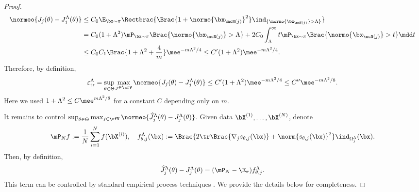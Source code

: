 \documentclass[11pt]{article}
\begin{document}
\begin{proof}
\begin{align*}
    \normeo{J_j(\theta)-J_j^\Lambda(\theta)}
    &\le C_0 \E_{\bx\sim\pi} \Rectbrac{\Brac{1+\normo{\bx_{\mcN(j)}}^2}\ind_{\{\normo{\bx_{\mcN(j)}}>\Lambda\}}} \\
    &= C_0(1+\Lambda^2) \mP_{\bx\sim\pi} \Brac{ \normo{\bx_{\mcN(j)}}>\Lambda } 
    +2C_0\int_\Lambda^\infty t\mP_{\bx\sim\pi} \Brac{\normo{\bx_{\mcN(j)}}>t} \mdd t \\
    &\le C_0C_1\Brac{1+\Lambda^2+\frac{4}{m}}\mee^{-m\Lambda^2/4}
    \le C'(1+\Lambda^2)\mee^{-m\Lambda^2/4}.
\end{align*}
Therefore, by definition,
\begin{equation}
\label{eqn:pf_LSM_truncation_error}
    \varepsilon_{\rm tr}^\Lambda = \sup_{\theta \in \Theta} \max_{j \in \sfV} \normeo{ J_j(\theta) - J_j^\Lambda(\theta) } \le C'(1+\Lambda^2) \mee^{-m\Lambda^2/4} \le C'' \mee^{-m\Lambda^2/8}.
\end{equation}
Here we used $1+\Lambda^2 \le C \mee^{m\Lambda^2/8}$ for a constant $C$ depending only on $m$.


It remains to control $\sup_{\theta \in \Theta} \max_{j \in \sfV} \normeo{ \widehat{J}_j^\Lambda(\theta) - J_j^\Lambda(\theta) }$.
Given data $\bX^{(1)},\dots,\bX^{(N)}$, denote
\[
    \mP_N f := \frac{1}{N} \sum_{i=1}^N f(\bX^{(i)}),\quad f_{\theta,j}^\Lambda(\bx) := \Brac{2 \tr \Brac{ \nabla_j s_{\theta,j} (\bx) } + \norm{s_{\theta,j}(\bx)}^2}\ind_{\Omega_j^\Lambda}(\bx).
\]
Then, by definition,
\begin{equation}
\label{eqn:pf_LSM_emp}
    \widehat{J}_j^\Lambda(\theta) - J_j^\Lambda(\theta) = (\mP_N - \E_\pi) f_{\theta,j}^\Lambda.
\end{equation}
This term can be controlled by standard empirical process techniques \cite{MR1385671}.
We provide the details below for completeness.



\end{proof}
\end{document}
